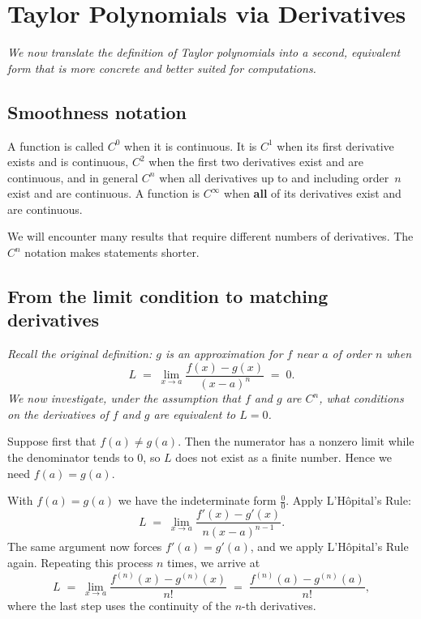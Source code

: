 \section{Taylor Polynomials via Derivatives}
\label{sec:14.4}

\textit{We now translate the definition of Taylor polynomials into a second, equivalent form that is more concrete and better suited for computations.}

\subsection*{Smoothness notation}

\begin{definition}[$C^{n}$ functions]
\label{def:14-5}
A function is called $C^{0}$ when it is continuous.  It is $C^{1}$ when its first derivative exists and is continuous, $C^{2}$ when the first two derivatives exist and are continuous, and in general $C^{n}$ when all derivatives up to and including order~$n$ exist and are continuous.  A function is $C^{\infty}$ when \textbf{all} of its derivatives exist and are continuous.
\end{definition}

\begin{remark}
We will encounter many results that require different numbers of derivatives.  The $C^{n}$ notation makes statements shorter.
\end{remark}

\subsection*{From the limit condition to matching derivatives}

\textit{Recall the original definition: $g$ is an approximation for $f$ near $a$ of order $n$ when}
\[
  L \;=\; \lim_{x\to a}\frac{f(x)-g(x)}{(x-a)^{n}} \;=\; 0.
\]
\textit{We now investigate, under the assumption that $f$ and $g$ are $C^{n}$, what conditions on the derivatives of $f$ and $g$ are equivalent to $L=0$.}

Suppose first that $f(a)\neq g(a)$.  Then the numerator has a nonzero limit while the denominator tends to $0$, so $L$ does not exist as a finite number.  Hence we need $f(a)=g(a)$.

With $f(a)=g(a)$ we have the indeterminate form $\frac{0}{0}$.  Apply L'H\^{o}pital's Rule:
\[
  L \;=\; \lim_{x\to a}\frac{f'(x)-g'(x)}{n(x-a)^{n-1}}.
\]
The same argument now forces $f'(a)=g'(a)$, and we apply L'H\^{o}pital's Rule again.  Repeating this process $n$ times, we arrive at
\[
  L \;=\; \lim_{x\to a}\frac{f^{(n)}(x)-g^{(n)}(x)}{n!}
  \;=\; \frac{f^{(n)}(a)-g^{(n)}(a)}{n!},
\]
where the last step uses the continuity of the $n$-th derivatives.

